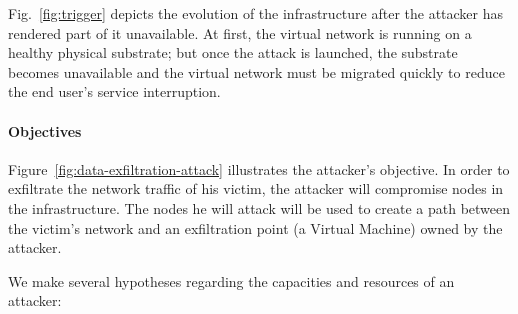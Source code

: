 \label{sec:attack_model}

Fig.~\ref{fig:trigger} depicts the evolution of the infrastructure after the attacker has rendered part of it unavailable. 
At first, the virtual network is running on a healthy physical substrate; but once the attack is launched, the substrate becomes unavailable and the virtual network must be migrated quickly to reduce the end user's service interruption.

\paragraph{Objectives}
Figure~\ref{fig:data-exfiltration-attack} illustrates the attacker's objective.
In order to exfiltrate the network traffic of his victim, the attacker will compromise nodes in the infrastructure. The nodes he will attack will be used to create a path between the victim's network and an exfiltration point (\eg a Virtual Machine) owned by the attacker.

We make several hypotheses regarding the capacities and resources of an attacker:

